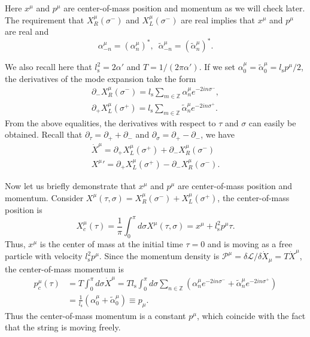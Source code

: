 \documentclass[graybox,envcountchap,sectrefs]{svmono}
\begin{document}
Here $x^{\mu}$ and $p^{\mu}$ are center-of-mass position and momentum as we will check later. The requirement that $X_R^{\mu}(\sigma^-)$ and $X_L^{\mu}(\sigma^-)$ are real implies that $x^{\mu}$ and $p^{\mu}$ are real and
\begin{equation}
\alpha_{-n}^{\mu}=(\alpha_{n}^{\mu})^*,\,\,\,\tilde{\alpha}_{-n}^{\mu}=(\tilde{\alpha}_{n}^{\mu})^*. 
\end{equation}

We also recall here that $l_{\mathrm{s}}^2=2\alpha'$ and $T=1/(2\pi\alpha')$. If we set $\alpha_0^{\mu}=\tilde{\alpha}_{0}^{\mu}=l_{\mathrm{s}}p^{\mu}/2$, the derivatives of the mode expansion take the form
\begin{align}
\partial_{-}X_R^{\mu}(\sigma^{-})=l_{\mathrm{s}}\sum_{m\in \mathbb{Z}}\alpha^{\mu}_ne^{-2in\sigma^{-}},\label{eq:pplus}\\
\partial_{+}X_L^{\mu}(\sigma^{+})=l_{\mathrm{s}}\sum_{m\in \mathbb{Z}}\tilde{\alpha}^{\mu}_ne^{-2in\sigma^{+}}\label{eq:minus}.
\end{align}
From the above equalities, the derivatives with respect to $\tau$ and $\sigma$ can easily be obtained. Recall that $\partial_{\tau}=\partial_{+}+\partial_{-}$ and $\partial_{\sigma}=\partial_{+}-\partial_{-}$, we have
\begin{align}
\dot{X}^{\mu}=\partial_{+}X_L^{\mu}(\sigma^{+})+\partial_{-}X_R^{\mu}(\sigma^{-})\label{eq:pplus1}\\
{X^{\mu}}'=\partial_{+}X_L^{\mu}(\sigma^{+})-\partial_{-}X_R^{\mu}(\sigma^{-})\label{eq:pminus1}.
\end{align}


Now let us briefly demonstrate that $x^{\mu}$ and $p^{\mu}$ are center-of-mass position and momentum. Consider $X^{\mu}(\tau,\sigma)=X_R^{\mu}(\sigma^-)+X_L^{\mu}(\sigma^+)$, the center-of-mass position is
\begin{equation}
X_{c}^{\mu}(\tau)=\frac{1}{\pi}\int_0^{\pi}d\sigma X^{\mu}(\tau,\sigma)=x^{\mu}+l_{\mathrm{s}}^2p^{\mu}\tau.
\end{equation}
Thus, $x^{\mu}$ is the center of mass at the initial time $\tau=0$ and is moving as a free particle with velocity $l_{\mathrm{s}}^2p^{\mu}$.
Since the momentum density is $\mathcal{P}^{\mu}=\delta{\mathcal{L}}/\delta \dot{X}_{\mu}=T\dot{X}^{\mu}$, the center-of-mass momentum is
\begin{align}
p^{\mu}_c(\tau)&=T\int_0^{\pi}d\sigma \dot{X}^{\mu}=Tl_{\mathrm{s}}\int_0^{\pi}d\sigma\sum_{n\in\mathbb{Z}}(\alpha^{\mu}_ne^{-2in\sigma^{-}}+\tilde{\alpha}^{\mu}_ne^{-2in\sigma^{+}})\nonumber\\
&=\frac{1}{l_{\mathrm{s}}}(\alpha_0^{\mu}+\tilde{\alpha}_0^{\mu})\equiv p_{\mu}.
\end{align}
Thus the center-of-mass momentum is a constant $p^{\mu}$, which coincide with the fact that the string is moving freely.
\end{document}
